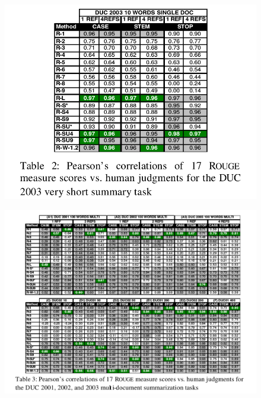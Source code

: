 \documentclass[xcolor={table}]{beamer}
\begin{document}
\begin{frame}[t]{\cite{lin2004rouge}}
      \begin{figure}[h]
          \centering
      \includegraphics[scale=.25]{images/table2-lin04.png} \\
  \end{figure}
\end{frame}
\begin{frame}[t]{\cite{lin2004rouge}}
      \begin{figure}[h]
          \centering
      \includegraphics[scale=.25]{images/table3-lin04.png} \\
  \end{figure}
\end{frame}
\end{document}
